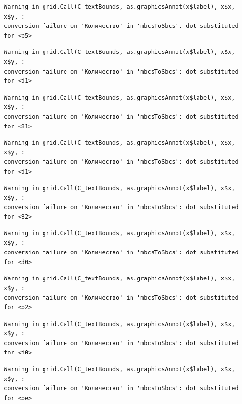\documentclass[
  letterpaper,
]{scrbook}
\theoremstyle{definition}
\theoremstyle{remark}
\begin{document}
\begin{verbatim}
Warning in grid.Call(C_textBounds, as.graphicsAnnot(x$label), x$x, x$y, :
conversion failure on 'Количество' in 'mbcsToSbcs': dot substituted for <b5>
\end{verbatim}

\begin{verbatim}
Warning in grid.Call(C_textBounds, as.graphicsAnnot(x$label), x$x, x$y, :
conversion failure on 'Количество' in 'mbcsToSbcs': dot substituted for <d1>
\end{verbatim}

\begin{verbatim}
Warning in grid.Call(C_textBounds, as.graphicsAnnot(x$label), x$x, x$y, :
conversion failure on 'Количество' in 'mbcsToSbcs': dot substituted for <81>
\end{verbatim}

\begin{verbatim}
Warning in grid.Call(C_textBounds, as.graphicsAnnot(x$label), x$x, x$y, :
conversion failure on 'Количество' in 'mbcsToSbcs': dot substituted for <d1>
\end{verbatim}

\begin{verbatim}
Warning in grid.Call(C_textBounds, as.graphicsAnnot(x$label), x$x, x$y, :
conversion failure on 'Количество' in 'mbcsToSbcs': dot substituted for <82>
\end{verbatim}

\begin{verbatim}
Warning in grid.Call(C_textBounds, as.graphicsAnnot(x$label), x$x, x$y, :
conversion failure on 'Количество' in 'mbcsToSbcs': dot substituted for <d0>
\end{verbatim}

\begin{verbatim}
Warning in grid.Call(C_textBounds, as.graphicsAnnot(x$label), x$x, x$y, :
conversion failure on 'Количество' in 'mbcsToSbcs': dot substituted for <b2>
\end{verbatim}

\begin{verbatim}
Warning in grid.Call(C_textBounds, as.graphicsAnnot(x$label), x$x, x$y, :
conversion failure on 'Количество' in 'mbcsToSbcs': dot substituted for <d0>
\end{verbatim}

\begin{verbatim}
Warning in grid.Call(C_textBounds, as.graphicsAnnot(x$label), x$x, x$y, :
conversion failure on 'Количество' in 'mbcsToSbcs': dot substituted for <be>
\end{verbatim}
\end{document}
